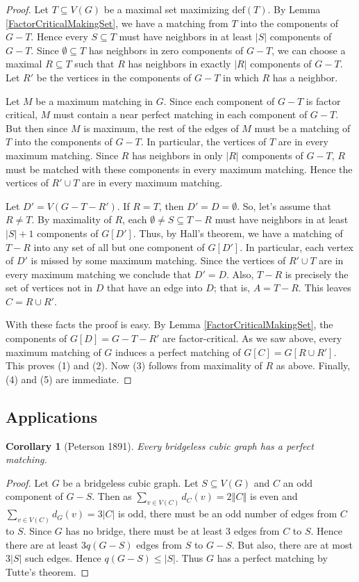 \documentclass[12pt]{article}
\theoremstyle{plain}
\newtheorem{cor}[thm]{Corollary}
\theoremstyle{definition}
\theoremstyle{remark}
\newcommand{\card}[1]{\left|#1\right|}
\newcommand{\size}[1]{\left\Vert#1\right\Vert}
\newcommand{\defic}[1]{\text{def}(#1)}
\begin{document}
\begin{proof}
Let $T \subseteq V(G)$ be a maximal set maximizing $\defic{T}$.  By Lemma \ref{FactorCriticalMakingSet}, we have a matching from $T$ into the components of $G-T$.  Hence every $S \subseteq T$ must have neighbors in at least $\card{S}$ components of $G-T$.  Since $\emptyset \subseteq T$ has neighbors in zero components of $G-T$, we can choose a maximal $R \subseteq T$ such that $R$ has neighbors in exactly $\card{R}$ components of $G-T$.  Let $R'$ be the vertices in the components of $G-T$ in which $R$ has a neighbor.

Let $M$ be a maximum matching in $G$.  Since each component of $G-T$ is factor critical, $M$ must contain a near perfect matching in each component of $G-T$.  But then since $M$ is maximum, the rest of the edges of $M$ must be a matching of $T$ into the components of $G-T$.  In particular, the vertices of $T$ are in every maximum matching.  Since $R$ has neighbors in only $\card{R}$ components of $G-T$, $R$ must be matched with these components in every maximum matching.  Hence the vertices of $R' \cup T$ are in every maximum matching.

Let $D' = V(G - T - R')$.  If $R = T$, then $D' = D = \emptyset$.  So, let's assume that $R \neq T$.  By maximality of $R$, each $\emptyset \neq S \subseteq T - R$ must have neighbors in at least $\card{S} + 1$ components of $G[D']$.  Thus, by Hall's theorem, we have a matching of $T - R$ into any set of all but one component of $G[D']$.  In particular, each vertex of $D'$ is missed by some maximum matching.  Since the vertices of $R' \cup T$ are in every maximum matching we conclude that $D' = D$.  Also, $T-R$ is precisely the set of vertices not in $D$ that have an edge into $D$; that is, $A = T-R$.  This leaves $C = R \cup R'$.

With these facts the proof is easy.  By Lemma \ref{FactorCriticalMakingSet}, the components of $G[D] = G - T - R'$ are factor-critical.  As we saw above, every maximum matching of $G$ induces a perfect matching of $G[C] = G[R \cup R']$.  This proves (1) and (2).  Now (3) follows from maximality of $R$ as above.  Finally, (4) and (5) are immediate.
\end{proof}

\subsection{Applications}
\begin{cor}[Peterson 1891]
Every bridgeless cubic graph has a perfect matching.
\end{cor}
\begin{proof}
Let $G$ be a bridgeless cubic graph.  Let $S \subseteq V(G)$ and $C$ an odd component of $G-S$.  Then as $\sum_{v \in V(C)} d_C(v) = 2 \size{C}$ is even and
$\sum_{v \in V(C)} d_G(v) = 3 \card{C}$ is odd, there must be an odd number of edges from $C$ to $S$.  Since $G$ has no bridge, there must be at least $3$ edges from $C$ to $S$.  Hence there are at least $3q(G-S)$ edges from $S$ to $G-S$.  But also, there are at most $3\card{S}$ such edges.  Hence $q(G-S) \leq \card{S}$.  Thus $G$ has a perfect matching by Tutte's theorem.
\end{proof}
\end{document}
